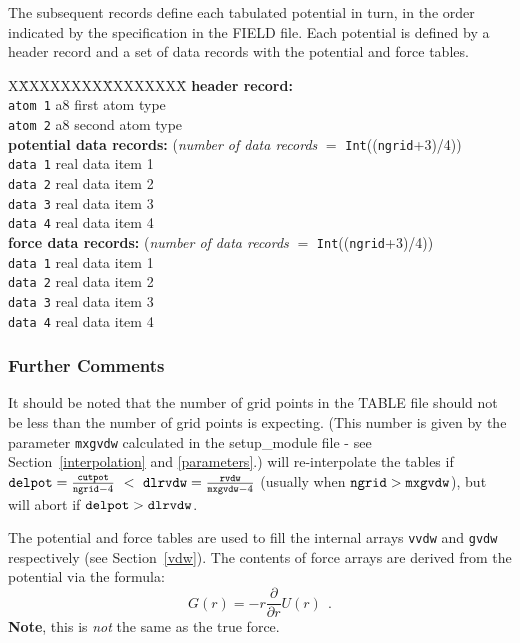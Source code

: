 The subsequent records define each tabulated potential in turn,
{in the order indicated by the specification in the FIELD file}.
Each potential is defined by a header record and a set of data
records with the potential and force tables.

\begin{tabbing}
X\=XXXXXXXX\=XXXXXXXX\=\kill
{\bf header record:} \\
\> {\tt atom 1} \> a8   \> first atom type \\
\> {\tt atom 2} \> a8   \> second atom type \\
{\bf potential data records:} ({\em number of data records} $=$ {\tt Int}(({\tt ngrid}+3)/4)) \\
\> {\tt data 1} \> real \> data item 1 \\
\> {\tt data 2} \> real \> data item 2 \\
\> {\tt data 3} \> real \> data item 3 \\
\> {\tt data 4} \> real \> data item 4 \\
{\bf force data records:} ({\em number of data records} $=$ {\tt Int}(({\tt ngrid}+3)/4)) \\
\> {\tt data 1} \> real \> data item 1 \\
\> {\tt data 2} \> real \> data item 2 \\
\> {\tt data 3} \> real \> data item 3 \\
\> {\tt data 4} \> real \> data item 4
\end{tabbing}

\subsubsection{Further Comments}

It should be noted that the number of grid points in the TABLE file
should not be less than the number of grid points \D is expecting.
(This number is given by the parameter {\tt mxgvdw} calculated in
the {\sc setup\_module} file - see Section~\ref{interpolation} and
\ref{parameters}.)  \D will re-interpolate the tables if
${\tt delpot} = \frac{\tt cutpot}{{\tt ngrid}-4}~<~{\tt dlrvdw} = \frac{\tt rvdw}{{\tt mxgvdw}-4}$
(usually when ${\tt ngrid}>{\tt mxgvdw}$), but will abort if ${\tt delpot}>{\tt dlrvdw}$.

The potential and force tables are used to fill the internal
arrays {\tt vvdw} and {\tt gvdw} respectively (see Section~\ref{vdw}).
The contents of force arrays are derived from the potential via the formula:
\begin{equation}
G(r)=-r\frac{\partial}{\partial r}U(r)~~.
\end{equation}
{\bf Note}, this is {\em not} the same as the true force.


